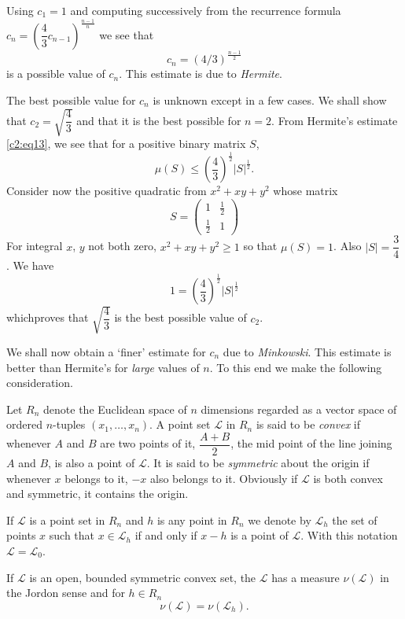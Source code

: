 Using $c_{1}=1$ and computing successively from the recurrence formula
$c_{n}=\left(\dfrac{4}{3}c_{n-1}\right)^{\frac{n-1}{n}}$ we see that
\begin{equation*}
c_{n}=(4/3)^{\frac{n-1}{2}}\tag{13}\label{c2:eq13}
\end{equation*}
is a possible value of $c_{n}$. This estimate is due to {\em Hermite}.

The best possible value for $c_{n}$ is unknown except in a few
cases. We shall show that $c_{2}=\sqrt{\dfrac{4}{3}}$ and that it is
the best possible for $n=2$. From Hermite's estimate \eqref{c2:eq13}, we
see that for a positive binary matrix $S$,
$$
\mu(S)\leq \left(\frac{4}{3}\right)^{\frac{1}{2}}|S|^{\frac{1}{2}}.
$$
Consider now the positive quadratic from $x^{2}+xy+y^{2}$ whose matrix
$$
S=
\begin{pmatrix}
1 & \frac{1}{2}\\
\frac{1}{2} & 1
\end{pmatrix}
$$
For integral $x$, $y$ not both zero, $x^{2}+xy+y^{2}\geq 1$ so that
$\mu(S)=1$. Also $|S|=\dfrac{3}{4}$. We have
$$
1=\left(\frac{4}{3}\right)^{\frac{1}{2}}|S|^{\frac{1}{2}}
$$
which\pageoriginale proves that $\sqrt{\dfrac{4}{3}}$ is the best
possible value of $c_{2}$.

We shall now obtain a `finer' estimate for $c_{n}$ due to {\em
  Minkowski}. This estimate is better than Hermite's for {\em large}
values of $n$. To this end we make the following consideration.

Let $R_{n}$ denote the Euclidean space of $n$ dimensions regarded as a
vector space of ordered $n$-tuples $(x_{1},\ldots,x_{n})$. A point set
$\mathscr{L}$ in $R_{n}$ is said to be {\em convex} if whenever $A$
and $B$ are two points of it, $\dfrac{A+B}{2}$, the mid point of the
line joining $A$ and $B$, is also a point of $\mathscr{L}$. It is said
to be {\em symmetric} about the origin if whenever $x$ belongs to it,
$-x$ also belongs to it. Obviously if $\mathscr{L}$ is both convex and
symmetric, it contains the origin.

If $\mathscr{L}$ is a point set in $R_{n}$ and $h$ is any point in
$R_{n}$ we denote by $\mathscr{L}_{h}$ the set of points $x$ such that
$x\in\mathscr{L}_{h}$ if and only if $x-h$ is a point of
$\mathscr{L}$. With this notation $\mathscr{L}=\mathscr{L}_{0}$.

If $\mathscr{L}$ is an open, bounded symmetric convex set, the
$\mathscr{L}$ has a measure $\nu(\mathscr{L})$ in the Jordon sense and
for $h\in R_{n}$
$$
\nu(\mathscr{L})=\nu(\mathscr{L}_{h}).
$$

